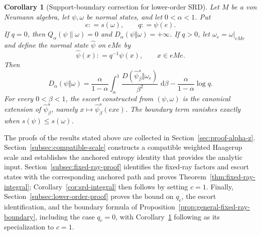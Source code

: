\documentclass[12pt]{article}
\numberwithin{equation}{section}
\newtheorem{corollary}[theorem]{Corollary}
\theoremstyle{definition}
\theoremstyle{remark}
\newcommand{\dd}{\,\mathrm d}
\newcommand{\?}{\overset{?}{=}}
\newcommand{\defeq}{\mathrel{\mathop:}=}
\DeclareMathOperator{\tr}{tr}
\DeclareMathOperator{\Tr}{Tr}
\begin{document}
\begin{corollary}[Support-boundary correction for lower-order SRD]
\label{cor:srd-support-boundary}
Let $M$ be a von Neumann algebra, let $\psi,\omega$ be normal states, and
let $0<\alpha<1$.  Put
\begin{equation}
  e\defeq s(\omega),\qquad q\defeq \psi(e).
  \label{eq:srd-overlap}
\end{equation}
If $q=0$, then
$Q_\alpha(\psi\|\omega)=0$ and
$D_\alpha(\psi\Vert\omega)=+\infty$.  If $q>0$, let
$\omega_e=\omega\vert_{eMe}$ and define the normal state
$\widehat\psi$ on $eMe$ by
\begin{equation}
  \widehat\psi(x)\defeq q^{-1}\psi(x),
  \qquad x\in eMe.
  \label{eq:normalized-compression}
\end{equation}
Then
\begin{equation}
  D_\alpha(\psi\Vert\omega)
  =\frac{\alpha}{1-\alpha}
   \int_\alpha^1
   \frac{D(\widehat\psi_\beta^s\Vert\omega_e)}{\beta^2}
   \,\dd\beta
   -\frac{\alpha}{1-\alpha}\log q.
  \label{eq:srd-support-boundary}
\end{equation}
For every $0<\beta<1$, the escort constructed from $(\psi,\omega)$ is the
canonical extension of $\widehat\psi_\beta^s$, namely
$x\mapsto\widehat\psi_\beta^s(exe)$.  The boundary term vanishes exactly
when $s(\psi)\leq s(\omega)$.
\end{corollary}


The proofs of the results stated above are collected in Section~\ref{sec:proof-alpha-z}. Section~\ref{subsec:compatible-scale} constructs a compatible weighted Haagerup scale and establishes the anchored entropy identity that provides the analytic input. Section~\ref{subsec:fixed-ray-proof} identifies the fixed-ray factors and escort states with the corresponding anchored path and proves Theorem~\ref{thm:fixed-ray-integral}; Corollary~\ref{cor:srd-integral} then follows by setting \(c=1\). Finally, Section~\ref{subsec:lower-order-proof} proves the bound on \(q_c\), the escort identification, and the boundary formula of Proposition~\ref{prop:general-fixed-ray-boundary}, including the case \(q_c=0\), with Corollary~\ref{cor:srd-support-boundary} following as its specialization to \(c=1\).
\end{document}

